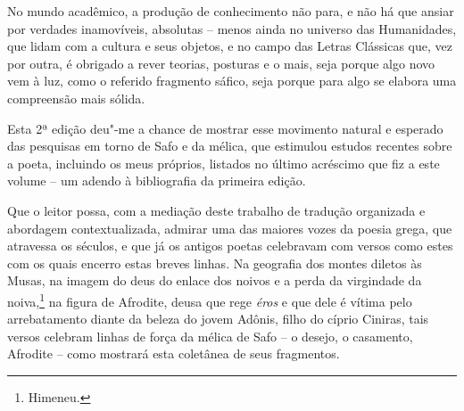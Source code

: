 No mundo acadêmico, a produção de conhecimento não para, e não há que
ansiar por verdades inamovíveis, absolutas -- menos ainda no universo
das Humanidades, que lidam com a cultura e seus objetos,
e no campo das Letras Clássicas que, vez por outra, é obrigado a rever
teorias, posturas e o mais, seja porque algo novo vem à luz, como o 
referido fragmento sáfico, seja porque para algo se elabora uma compreensão mais
sólida.

Esta 2ª edição deu"-me a chance de mostrar esse movimento natural e
esperado das pesquisas em torno de Safo e da mélica, que estimulou
estudos recentes sobre a poeta, incluindo os meus próprios, listados no
último acréscimo que fiz a este volume -- um adendo à bibliografia
da primeira edição.

Que o leitor possa, com a mediação deste trabalho de tradução organizada
e abordagem contextualizada, admirar uma das maiores vozes da poesia grega, que
atravessa os séculos, e que já os antigos poetas celebravam com versos
como estes com os quais encerro estas breves linhas.
Na geografia dos montes diletos às Musas, na imagem do deus do enlace dos noivos 
e a perda da virgindade da noiva,\footnote{Himeneu.} na figura de Afrodite, deusa 
que rege \textit{éros} e que dele é vítima pelo arrebatamento diante 
da beleza do jovem Adônis, filho do cíprio Ciniras, tais versos celebram 
linhas de força da mélica de Safo -- o desejo, o casamento, Afrodite -- como 
mostrará esta coletânea de seus fragmentos.